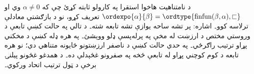 \documentclass[../../../include/open-logic-section]{subfiles}
\begin{document}
\begin{prob}
د نامتناهيت هاخوا استقرا په کارولو ثابته کړئ چې که $\alpha\neq0$ وي او
$\ordexpo{\alpha}{\beta} = \ordtype{\text{finfun}(\beta, \alpha),
\sqsubset}$ تعريف کړو، نو د
 بازګشتي معادلې
ترلاسه کوو۔ اشاره: پر تشه ساحه يوازې تشه تابعه شته۔ د
تالي په حالت کښې تابعې د وروستي مختص د ارزښت له مخې په
پرله‌پسې ډلو ووېشئ۔ په هره ډله کښې د مخکني پړاو ترتيب
راګرځي۔ په حدي حالت کښې د ناصفر ارزښتونو ځايونه متناهي دي؛
نو هره تابعه د کوم کوچني پړاو له تابعې څخه په صفرونو
غځېدلې ده۔ د همدغو غځونو پيلنۍ برخې د ټول ترتيب اتحاد ورکوي۔
\end{prob}
\end{document}
